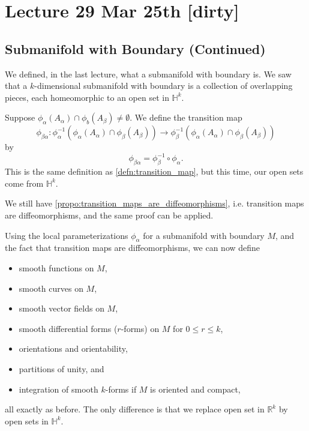 \documentclass[notoc,notitlepage]{tufte-book}
\begin{document}


\chapter{Lecture 29 Mar 25th [dirty]}%
\label{chp:lecture_29_mar_25th}

\section{Submanifold with Boundary (Continued)}%
\label{sec:submanifold_with_boundary_continued}

We defined, in the last lecture, what a submanifold with boundary is. We saw
that a $k$-dimensional submanifold with boundary is a collection of overlapping
pieces, each homeomorphic to an open set in $\mathbb{H}^k$.

Suppose $\phi_\alpha(A_\alpha) \cap \phi_b(A_\beta) \neq \emptyset$. We define
the transition map
\begin{equation*}
  \phi_{\beta\alpha} : \phi_\alpha^{-1}(\phi_\alpha(A_\alpha) \cap
  \phi_\beta(A_\beta)) \to \phi_\beta^{-1}(\phi_\alpha(A_\alpha) \cap
  \phi_\beta(A_\beta))
\end{equation*}
by
\begin{equation*}
  \phi_{\beta\alpha} = \phi_\beta^{-1} \circ \phi_\alpha.
\end{equation*}
This is the same definition as \cref{defn:transition_map}, but this time, our
open sets come from $\mathbb{H}^k$.

We still have \cref{propo:transition_maps_are_diffeomorphisms}, i.e. 
transition maps are diffeomorphisms, and the same proof can be applied.

\begin{remark}
  Using the local parameterizations $\phi_\alpha$ for a submanifold with boundary
  $M$, and the fact that transition maps are diffeomorphisms, we can now define
  \begin{itemize}
    \item smooth functions on $M$,
    \item smooth curves on $M$, 
    \item smooth vector fields on $M$,
    \item smooth differential forms ($r$-forms) on $M$ for $0 \leq r \leq k$,
    \item orientations and orientability,
    \item partitions of unity, and
    \item integration of smooth $k$-forms if $M$ is oriented and compact,
  \end{itemize}
  all exactly as before. The only difference is that we replace open set in
  $\mathbb{R}^k$ by open sets in $\mathbb{H}^k$.
\end{remark}
\end{document}
